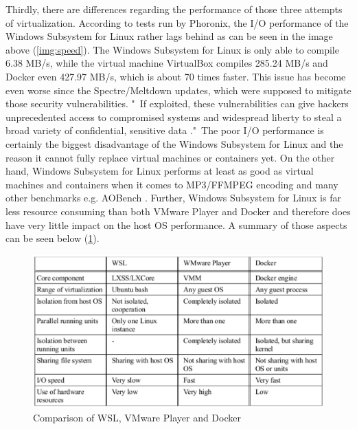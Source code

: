 \documentclass[utf8,biblatex, ngerman, english]{lni}
\begin{document}
Thirdly, there are differences regarding the performance of those three attempts of virtualization. According to tests run by Phoronix, the I/O performance of the Windows Subsystem for Linux rather lags behind as can be seen in the image above (\ref{img:speed}). The Windows Subsystem for Linux is only able to compile 6.38 MB/s, while the virtual machine VirtualBox compiles 285.24 MB/s and Docker even 427.97 MB/s, which is about 70 times faster. This issue has become even worse since the Spectre/Meltdown updates, which were supposed to mitigate those security vulnerabilities. "\ If exploited, these vulnerabilities can give hackers unprecedented access to compromised systems and widespread liberty to steal a broad variety of confidential, sensitive data \cite{Pe18}."\ The poor I/O performance is certainly the biggest disadvantage of the Windows Subsystem for Linux and the reason it cannot fully replace virtual machines or containers yet. On the other hand, Windows Subsystem for Linux performs at least as good as virtual machines and containers when it comes to MP3/FFMPEG encoding and many other benchmarks e.g. AOBench \cite{La18}. Further, Windows Subsystem for Linux is far less resource consuming than both VMware Player and Docker and therefore does have very little impact on the host OS performance. A summary of those aspects can be seen below (\ref{tab:demo}).

\begin{figure}
  \includegraphics[width=1\textwidth]{Tabelle.pdf}
  \caption{Comparison of WSL, VMware Player and Docker}
  \label{tab:demo} 
\end{figure}
\end{document}
